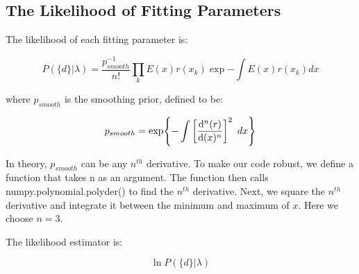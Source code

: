 \subsection{The Likelihood of Fitting Parameters}
\label{subsec:likelihood}

The likelihood of each fitting parameter is:

\begin{equation}
\label{likelihood}
P(\{d\}|\lambda) = \frac{p_{smooth}^{-1}}{n!}\prod_{k} E(x)r(x_k) \exp{-\int E(x)r(x_k)dx}
\end{equation}

where $p_{smooth}$ is the smoothing prior, defined to be:

\begin{equation}
\label{smoothing_prior}
p_{smooth} = \exp{-\int \bigg[\dv[n]{(r)}{(x)}\bigg]^2 \hspace{5pt} dx}
\end{equation}

In theory, $p_{smooth}$ can be any $n^{th}$ derivative. To make our code robust, we define a function that takes n as an argument. The function then calls numpy.polynomial.polyder() to find the $n^{th}$ derivative. Next, we square the $n^{th}$ derivative and integrate it between the minimum and maximum of $x$. Here we choose $n = 3$.

The likelihood estimator is:

\begin{equation}
\label{likelihood_estimator}
\ln{P(\{d\}|\lambda)}
\end{equation}

